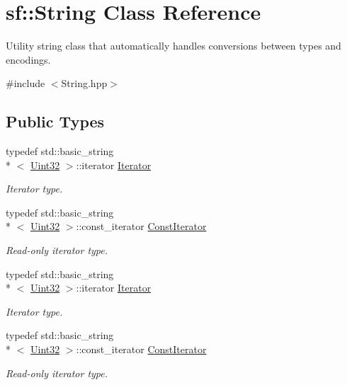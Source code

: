 \hypertarget{classsf_1_1_string}{\section{sf\-:\-:String Class Reference}
\label{classsf_1_1_string}
}


Utility string class that automatically handles conversions between types and encodings.  




{\ttfamily \#include $<$String.\-hpp$>$}

\subsection*{Public Types}
\begin{DoxyCompactItemize}
\item 
typedef std\-::basic\-\_\-string\\*
$<$ \hyperlink{namespacesf_aa746fb1ddef4410bddf198ebb27e727c}{Uint32} $>$\-::iterator \hyperlink{classsf_1_1_string_ac90f2b7b28f703020f8d027e98806235}{Iterator}
\begin{DoxyCompactList}\small\item\em Iterator type. \end{DoxyCompactList}\item 
typedef std\-::basic\-\_\-string\\*
$<$ \hyperlink{namespacesf_aa746fb1ddef4410bddf198ebb27e727c}{Uint32} $>$\-::const\-\_\-iterator \hyperlink{classsf_1_1_string_a8e18efc2e8464f6eb82818902d527efa}{Const\-Iterator}
\begin{DoxyCompactList}\small\item\em Read-\/only iterator type. \end{DoxyCompactList}\item 
typedef std\-::basic\-\_\-string\\*
$<$ \hyperlink{namespacesf_aa746fb1ddef4410bddf198ebb27e727c}{Uint32} $>$\-::iterator \hyperlink{classsf_1_1_string_ac90f2b7b28f703020f8d027e98806235}{Iterator}
\begin{DoxyCompactList}\small\item\em Iterator type. \end{DoxyCompactList}\item 
typedef std\-::basic\-\_\-string\\*
$<$ \hyperlink{namespacesf_aa746fb1ddef4410bddf198ebb27e727c}{Uint32} $>$\-::const\-\_\-iterator \hyperlink{classsf_1_1_string_a8e18efc2e8464f6eb82818902d527efa}{Const\-Iterator}
\begin{DoxyCompactList}\small\item\em Read-\/only iterator type. \end{DoxyCompactList}\end{DoxyCompactItemize}
